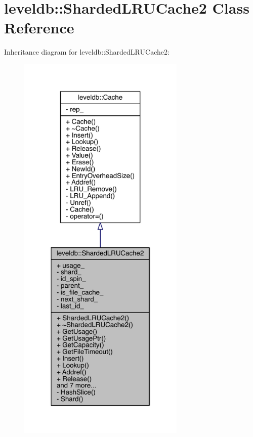\hypertarget{classleveldb_1_1_sharded_l_r_u_cache2}{}\section{leveldb\+:\+:Sharded\+L\+R\+U\+Cache2 Class Reference}
\label{classleveldb_1_1_sharded_l_r_u_cache2}


Inheritance diagram for leveldb\+:\+:Sharded\+L\+R\+U\+Cache2\+:\nopagebreak
\begin{figure}[H]
\begin{center}
\leavevmode
\includegraphics[width=226pt]{classleveldb_1_1_sharded_l_r_u_cache2__inherit__graph}
\end{center}
\end{figure}


